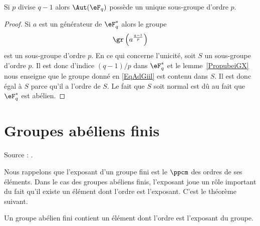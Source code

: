\begin{corollary}       \label{CorwgmoTK}
    Si \( p\) divise \( q-1\) alors \( \Aut(\eF_q)\) possède un unique sous-groupe d'ordre \( p\).
\end{corollary}

\begin{proof}
    Si \( a\) est un générateur de \( \eF_q^*\) alors le groupe
    \begin{equation}    \label{EqAdGiil}
        \gr\left( a^{\frac{ q-1 }{ p }} \right)
    \end{equation}
    est un sous-groupe d'ordre \( p\). En ce qui concerne l'unicité, soit \( S\) un sous-groupe d'ordre \( p\). Il est donc d'indice \( (q-1)/p\) dans \( \eF_q^*\) et le lemme~\ref{PropubeiGX} nous enseigne que le groupe donné en \eqref{EqAdGiil} est contenu dans \( S\). Il est donc égal à \( S\) parce qu'il a l'ordre de \( S\). Le fait que \( S\) soit normal est dû au fait que \( \eF_q^*\) est abélien.
\end{proof}




\section{Groupes abéliens finis}

Source : \cite{FabricegPSFinis}.

Nous rappelons que l'exposant d'un groupe fini est le \( \ppcm\) des ordres de ses éléments. Dans le cas des groupes abéliens finis, l'exposant joue un rôle important du fait qu'il existe un élément dont l'ordre est l'exposant. C'est le théorème suivant.

\begin{theorem}
    Un groupe abélien fini contient un élément dont l'ordre est l'exposant du groupe.
\end{theorem}

